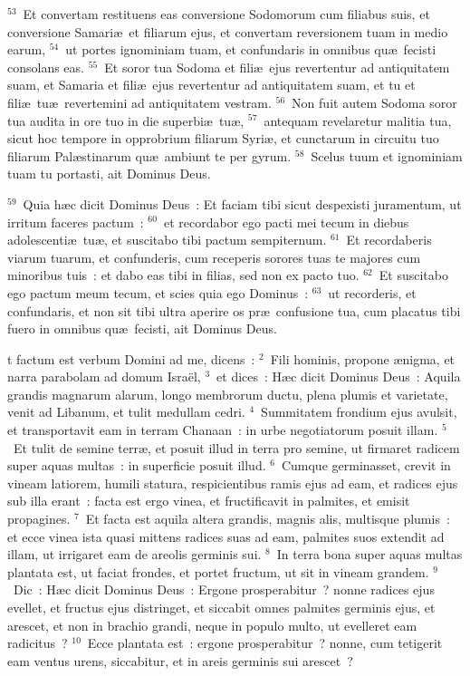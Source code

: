 ${}^{53}$~Et convertam restituens eas conversione Sodomorum cum filiabus suis, et conversione Samari\ae\ et filiarum ejus, et convertam reversionem tuam in medio earum,
${}^{54}$~ut portes ignominiam tuam, et confundaris in omnibus qu\ae\ fecisti consolans eas.
${}^{55}$~Et soror tua Sodoma et fili\ae\ ejus revertentur ad antiquitatem suam, et Samaria et fili\ae\ ejus revertentur ad antiquitatem suam, et tu et fili\ae\ tu\ae\ revertemini ad antiquitatem vestram.
${}^{56}$~Non fuit autem Sodoma soror tua audita in ore tuo in die superbi\ae\ tu\ae ,
${}^{57}$~antequam revelaretur malitia tua, sicut hoc tempore in opprobrium filiarum Syri\ae , et cunctarum in circuitu tuo filiarum Pal\ae stinarum qu\ae\ ambiunt te per gyrum.
${}^{58}$~Scelus tuum et ignominiam tuam tu portasti, ait Dominus Deus.


${}^{59}$~Quia h\ae c dicit Dominus Deus~: Et faciam tibi sicut despexisti juramentum, ut irritum faceres pactum~:
${}^{60}$~et recordabor ego pacti mei tecum in diebus adolescenti\ae\ tu\ae , et suscitabo tibi pactum sempiternum.
${}^{61}$~Et recordaberis viarum tuarum, et confunderis, cum receperis sorores tuas te majores cum minoribus tuis~: et dabo eas tibi in filias, sed non ex pacto tuo.
${}^{62}$~Et suscitabo ego pactum meum tecum, et scies quia ego Dominus~:
${}^{63}$~ut recorderis, et confundaris, et non sit tibi ultra aperire os pr\ae\ confusione tua, cum placatus tibi fuero in omnibus qu\ae\ fecisti, ait Dominus Deus.

\bchapter
{}t factum est verbum Domini ad me, dicens~:
${}^{2}$~Fili hominis, propone \ae nigma, et narra parabolam ad domum Isra\"el,
${}^{3}$~et dices~: H\ae c dicit Dominus Deus~: Aquila grandis magnarum alarum, longo membrorum ductu, plena plumis et varietate, venit ad Libanum, et tulit medullam cedri.
${}^{4}$~Summitatem frondium ejus avulsit, et transportavit eam in terram Chanaan~: in urbe negotiatorum posuit illam.
${}^{5}$~Et tulit de semine terr\ae , et posuit illud in terra pro semine, ut firmaret radicem super aquas multas~: in superficie posuit illud.
${}^{6}$~Cumque germinasset, crevit in vineam latiorem, humili statura, respicientibus ramis ejus ad eam, et radices ejus sub illa erant~: facta est ergo vinea, et fructificavit in palmites, et emisit propagines.
${}^{7}$~Et facta est aquila altera grandis, magnis alis, multisque plumis~: et ecce vinea ista quasi mittens radices suas ad eam, palmites suos extendit ad illam, ut irrigaret eam de areolis germinis sui.
${}^{8}$~In terra bona super aquas multas plantata est, ut faciat frondes, et portet fructum, ut sit in vineam grandem.
${}^{9}$~Dic~: H\ae c dicit Dominus Deus~: Ergone prosperabitur~? nonne radices ejus evellet, et fructus ejus distringet, et siccabit omnes palmites germinis ejus, et arescet, et non in brachio grandi, neque in populo multo, ut evelleret eam radicitus~?
${}^{10}$~Ecce plantata est~: ergone prosperabitur~? nonne, cum tetigerit eam ventus urens, siccabitur, et in areis germinis sui arescet~?


